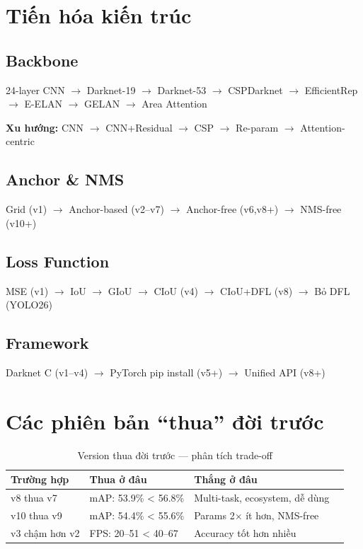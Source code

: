 \section{Tiến hóa kiến trúc}

\subsection{Backbone}
\begin{center}
24-layer CNN $\rightarrow$ Darknet-19 $\rightarrow$ Darknet-53 $\rightarrow$ CSPDarknet $\rightarrow$ EfficientRep $\rightarrow$ E-ELAN $\rightarrow$ GELAN $\rightarrow$ Area Attention
\end{center}
\textbf{Xu hướng:} CNN $\rightarrow$ CNN+Residual $\rightarrow$ CSP $\rightarrow$ Re-param $\rightarrow$ Attention-centric

\subsection{Anchor \& NMS}
\begin{center}
Grid (v1) $\rightarrow$ Anchor-based (v2--v7) $\rightarrow$ Anchor-free (v6,v8+) $\rightarrow$ NMS-free (v10+)
\end{center}

\subsection{Loss Function}
\begin{center}
MSE (v1) $\rightarrow$ IoU $\rightarrow$ GIoU $\rightarrow$ CIoU (v4) $\rightarrow$ CIoU+DFL (v8) $\rightarrow$ Bỏ DFL (YOLO26)
\end{center}

\subsection{Framework}
\begin{center}
Darknet C (v1--v4) $\rightarrow$ PyTorch pip install (v5+) $\rightarrow$ Unified API (v8+)
\end{center}

\section{Các phiên bản ``thua'' đời trước}

\begin{table}[H]\centering
\caption{Version thua đời trước — phân tích trade-off}
\begin{tabular}{llll}\toprule
\textbf{Trường hợp} & \textbf{Thua ở đâu} & \textbf{Thắng ở đâu}\\\midrule
v8 thua v7 & mAP: 53.9\% < 56.8\% & Multi-task, ecosystem, dễ dùng \\
v10 thua v9 & mAP: 54.4\% < 55.6\% & Params 2× ít hơn, NMS-free \\
v3 chậm hơn v2 & FPS: 20--51 < 40--67 & Accuracy tốt hơn nhiều \\
\bottomrule
\end{tabular}
\end{table}

